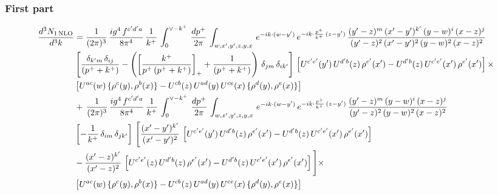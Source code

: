 \documentclass[9pt]{article}
\numberwithin{equation}{section}
\begin{document}
\subsubsection{First part}
\begin{align}
\frac{d^{3}N_{1\,\rm NLO}}{d^{3}k} & = \frac{1}{(2\pi)^{3}}\, \frac{ig^{4}\,f^{c'd'a}}{8\pi^{4}}\, \frac{1}{k^{+}}\,\int_{0}^{\vee - k^{+}}\,  \frac{dp^{+}}{2\pi}\, \int_{w,x',y',z,y,x}\, e^{-ik\cdot (w-y')}\, e^{-ik\cdot \frac{p^{+}}{k^{+}}\,(z-y')}\,\frac{(y'-z)^{m}\,(x'-y')^{k'}\,(y-w)^{i}\,(x-z)^{j}}{(y'-z)^{2}\,(x'-y')^{2}\,(y-w)^{2}\,(x-z)^{2}}\notag \\ & \left[\frac{\delta_{k'm}\,\delta_{ij}}{(p^{+}+k^{+})}-\left(\left[\frac{k^{+}}{p^{+}\,(p^{+}+k^{+})}\right]_{+}+\frac{1}{(p^{+}+k^{+})}\right)\,\delta_{jm}\,\delta_{ik'}\right]\, \left[U^{c'e'}(y')\,U^{d'b}(z)\,\rho^{e'}(x')-U^{d'b}(z)\,U^{c'e'}(x')\,\rho^{e'}(x')\right]\times\notag \\ & \left[U^{ac}(w)\, \{\rho^{c}(y),\rho^{b}(x)\}-U^{cb}(z)\,U^{ad}(y)\,U^{ce}(x)\,\{\rho^{d}(y),\rho^{e}(x)\}\right] \notag \\
&  +\,\frac{1}{(2\pi)^{3}}\, \frac{ig^{4}\,f^{c'd'a}}{8\pi^{4}}\, \frac{1}{k^{+}}\,\int_{0}^{\vee - k^{+}}\,  \frac{dp^{+}}{2\pi}\, \int_{w,x',y',z,y,x}\, e^{-ik\cdot (w-y')}\, e^{-ik\cdot \frac{p^{+}}{k^{+}}\,(z-y')}\,\frac{(y'-z)^{m}\,(y-w)^{i}\,(x-z)^{j}}{(y'-z)^{2}\,(y-w)^{2}\,(x-z)^{2}}\notag \\ & \left[-\frac{1}{k^{+}}\, \delta_{im}\, \delta_{jk'}\right]\, \Bigg[\frac{(x'-y')^{k'}}{(x'-y')^{2}}\,\left[U^{c'e'}(y')\,U^{d'b}(z)\,\rho^{e'}(x')-U^{d'b}(z)\,U^{c'e'}(x')\,\rho^{e'}(x')\right]\notag \\ & -\frac{(x'-z)^{k'}}{(x'-z)^{2}}\,\left[U^{c'e'}(z)\,U^{d'b}(z)\,\rho^{e'}(x')-U^{d'b}(z)\,U^{c'e'}(x')\,\rho^{e'}(x')\right]\Bigg]\times\notag \\ &   \left[U^{ac}(w)\, \{\rho^{c}(y),\rho^{b}(x)\}-U^{cb}(z)\,U^{ad}(y)\,U^{ce}(x)\,\{\rho^{d}(y),\rho^{e}(x)\}\right]
\end{align}
\end{document}
